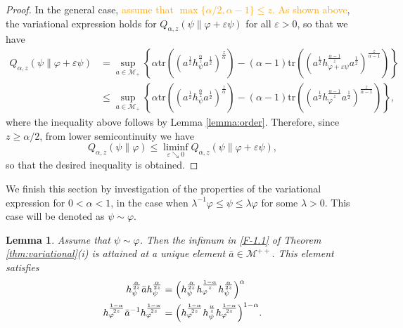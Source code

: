 \documentclass[12pt]{article}
\newtheorem{lemma}[theorem]{Lemma}
\theoremstyle{definition}
\theoremstyle{remark}
\numberwithin{equation}{section}
\def\Me{\mathcal M}
\def\Tr{\mathrm{tr}}
\def\ffi{\varphi}
\begin{document}
\begin{proof}
In the general case, \textcolor{orange}{assume that $\max\{\alpha/2,\alpha-1\}\le z$. As
shown above}, the variational expression holds for
$Q_{\alpha,z}(\psi\|\varphi+\varepsilon\psi)$  for all $\varepsilon>0$, so that we have
\begin{align*}
Q_{\alpha,z}(\psi\|\varphi+\varepsilon\psi)&=\sup_{a\in \Me_+} \left\{\alpha
\Tr\left((a^{\frac12}h_\psi^{\frac{\alpha}{z}}a^{\frac12})^{\frac{z}{\alpha}}\right)
-(\alpha-1)\Tr\left((a^{\frac12}h_{\varphi+\varepsilon \psi}^{\frac{\alpha-1}{z}}
a^{\frac12})^{\frac{z}{\alpha-1}}\right)\right\}\\
&\le\sup_{a\in \Me_+} \left\{\alpha
\Tr\left((a^{\frac12}h_\psi^{\frac{\alpha}{z}}a^{\frac12})^{\frac{z}{\alpha}}\right)-(\alpha-1)
\Tr\left((a^{\frac12}h_\varphi^{\frac{\alpha-1}{z}}a^{\frac12})^{\frac{z}{\alpha-1}}\right)
\right\},
\end{align*}
where the inequality above follows by Lemma \ref{lemma:order}. Therefore,
{since $z\ge\alpha/2$, from lower semicontinuity \cite[Theorem 2(iv)]{kato2023onrenyi}
we have}
\[
Q_{\alpha,z}(\psi\|\varphi)\le \liminf_{\varepsilon\searrow 0}
Q_{\alpha,z}(\psi\|\varphi+\varepsilon \psi),
\]
so that the desired inequality is obtained.
\end{proof}

We finish this section by investigation of the properties of the variational expression for
$0<\alpha<1$, in the case when $\lambda^{-1}\ffi\le \psi\le \lambda \ffi$ for some
$\lambda>0$. This case will be denoted as $\psi\sim \ffi$. 

\begin{lemma}\label{lemma:variational_majorized}
Assume that $\psi\sim\ffi$. Then the infimum in \eqref{F-1.1} of Theorem \ref{thm:variational}(i) is
attained at a unique element $\bar a\in \Me^{++}$. This element satisfies
\begin{align}
h_\psi^{\alpha\over2z}\bar ah_\psi^{\alpha\over2z}
&=\Bigl(h_\psi^{\alpha\over2z}h_\ffi^{1-\alpha\over z}h_\psi^{\alpha\over2z}\Bigr)^\alpha
\label{eq:minimizer1}\\
h_\ffi^{1-\alpha\over2z}\bar a^{-1}h_\ffi^{1-\alpha\over2z}
&=\Bigl(h_\ffi^{1-\alpha\over2z}h_\psi^{\alpha\over
z}h_\ffi^{1-\alpha\over2z}\Bigr)^{1-\alpha}.
\label{eq:minimizer2}
\end{align}
\end{lemma}
\end{document}
